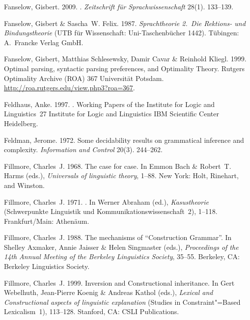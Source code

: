 \begin{thebibliography}{1420}
Fanselow, Gisbert. 2009.
.
\newblock \emph{Zeitschrift f{\"u}r Sprachwissenschaft} 28(1). 133--139.

Fanselow, Gisbert \& Sascha~W. Felix. 1987.
\newblock \emph{{Sprachtheorie 2.\ Die Rektions- und Bindungstheorie}} (UTB
  f{\"u}r Wissenschaft: Uni-Taschenb{\"u}cher 1442).
\newblock T{\"u}bingen: A.\ Francke Verlag GmbH.

Fanselow, Gisbert, Matthias Schlesewsky, Damir Cavar \& Reinhold Kliegl. 1999.
\newblock Optimal parsing, syntactic parsing preferences, and {Optimality
  Theory}.
\newblock Rutgers Optimality Archive (ROA) 367 Universit{\"a}t Potsdam.
\newblock \urlprefix\url{http://roa.rutgers.edu/view.php3?roa=367}.

Feldhaus, Anke. 1997.
.
\newblock Working Papers of the Institute for Logic and Linguistics~27
  Institute for Logic and Linguistics IBM Scientific Center Heidelberg.

Feldman, Jerome. 1972.
\newblock Some decidability results on grammatical inference and complexity.
\newblock \emph{Information and Control} 20(3). 244--262.

Fillmore, Charles~J. 1968.
\newblock The case for case.
\newblock In Emmon Bach \& Robert~T. Harms (eds.), \emph{Universals of
  linguistic theory}, 1--88. New York: Holt, Rinehart, and Winston.

Fillmore, Charles~J. 1971.
.
\newblock In Werner Abraham (ed.), \emph{Kasustheorie} (Schwerpunkte Linguistik
  und Kommunikationswissenschaft~2), 1--118. Frankfurt/Main: Athen{\"a}um.

Fillmore, Charles~J. 1988.
\newblock The mechanisms of ``{Construction Grammar}''.
\newblock In Shelley Axmaker, Annie Jaisser \& Helen Singmaster (eds.),
  \emph{Proceedings of the {14th Annual Meeting of the Berkeley Linguistics
  Society}}, 35--55. Berkeley, CA: Berkeley Linguistics Society.

Fillmore, Charles~J. 1999.
\newblock Inversion and {Constructional} inheritance.
\newblock In Gert Webelhuth, Jean-Pierre Koenig \& Andreas Kathol (eds.),
  \emph{Lexical and {Constructional} aspects of linguistic explanation}
  (Studies in Constraint"=Based Lexicalism~1), 113--128. Stanford, CA: CSLI
  Publications.


\end{thebibliography}
